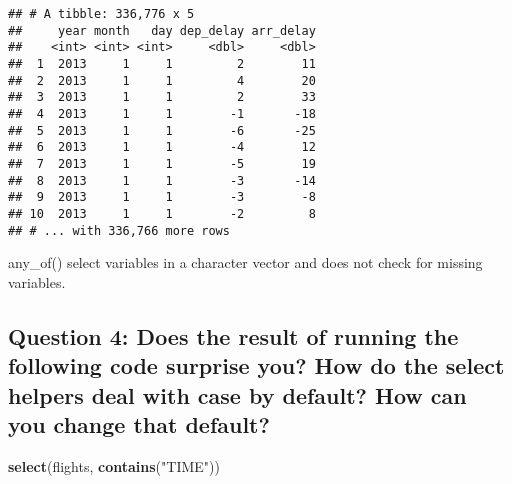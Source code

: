 \documentclass[
]{book}
\newenvironment{Shaded}{\begin{snugshade}}{\end{snugshade}}
\newcommand{\KeywordTok}[1]{\textcolor[rgb]{0.13,0.29,0.53}{\textbf{#1}}}
\newcommand{\NormalTok}[1]{#1}
\newcommand{\OperatorTok}[1]{\textcolor[rgb]{0.81,0.36,0.00}{\textbf{#1}}}
\newcommand{\StringTok}[1]{\textcolor[rgb]{0.31,0.60,0.02}{#1}}
\begin{document}
\begin{Shaded}
\end{Shaded}

\begin{verbatim}
## # A tibble: 336,776 x 5
##     year month   day dep_delay arr_delay
##    <int> <int> <int>     <dbl>     <dbl>
##  1  2013     1     1         2        11
##  2  2013     1     1         4        20
##  3  2013     1     1         2        33
##  4  2013     1     1        -1       -18
##  5  2013     1     1        -6       -25
##  6  2013     1     1        -4        12
##  7  2013     1     1        -5        19
##  8  2013     1     1        -3       -14
##  9  2013     1     1        -3        -8
## 10  2013     1     1        -2         8
## # ... with 336,766 more rows
\end{verbatim}

any\_of() select variables in a character vector and does not check for missing variables.

\hypertarget{question-4-does-the-result-of-running-the-following-code-surprise-you-how-do-the-select-helpers-deal-with-case-by-default-how-can-you-change-that-default}{%
\subsection{Question 4: Does the result of running the following code surprise you? How do the select helpers deal with case by default? How can you change that default?}\label{question-4-does-the-result-of-running-the-following-code-surprise-you-how-do-the-select-helpers-deal-with-case-by-default-how-can-you-change-that-default}}

\begin{Shaded}
\begin{Highlighting}[]
\KeywordTok{select}\NormalTok{(flights, }\KeywordTok{contains}\NormalTok{(}\StringTok{"TIME"}\NormalTok{))}
\end{Highlighting}
\end{Shaded}
\end{document}
